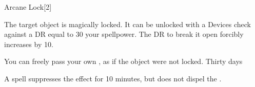 \begin{spellsection}{Arcane Lock}[2]
    \begin{spellheader}
    \end{spellheader}
    \begin{spellcontent}
        \begin{spelltargetinginfo}
        \end{spelltargetinginfo}
        \begin{spelleffects}
            \spelleffect The target object is magically locked. It can be unlocked with a Devices check against a DR equal to 30 \add your spellpower. The DR to break it open forcibly increases by 10.

            You can freely pass your own , as if the object were not locked.
            \spelldur Thirty days
        \end{spelleffects}
    \end{spellcontent}
    \begin{spellfooter}
        \spellnotes A  spell suppresses the effect for 10 minutes, but does not dispel the .
    \end{spellfooter}
    \begin{spellaugments}
    \end{spellaugments}
\end{spellsection}

